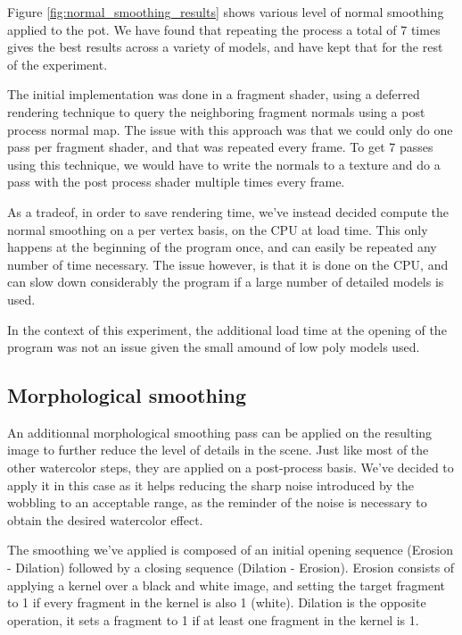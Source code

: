 \documentclass{article}
\begin{document}
\noindent
Figure \ref{fig:normal_smoothing_results} shows various level of normal smoothing applied to the pot. 
We have found that repeating the process a total of 7 times gives the best results across a variety of models,
and have kept that for the rest of the experiment.

\medskip \par
\noindent
The initial implementation was done in a fragment shader, using a deferred rendering technique to query the 
neighboring fragment normals using a post process normal map. The issue with this approach was that we could 
only do one pass per fragment shader, and that was repeated every frame. To get 7 passes using this technique, 
we would have to write the normals to a texture and do a pass with the post process shader multiple times every 
frame.

\medskip \par
\noindent
As a tradeof, in order to save rendering time, we've instead decided compute the normal smoothing on a per vertex basis, on
the CPU at load time. This only happens at the beginning of the program once, and can easily be repeated any 
number of time necessary. The issue however, is that it is done on the CPU, and can slow down considerably the 
program if a large number of detailed models is used. 

\medskip \par
\noindent
In the context of this experiment, the additional load time at the opening of the program was not an issue 
given the small amound of low poly models used.

\subsection{Morphological smoothing}

An additionnal morphological smoothing pass can be applied on the resulting image to further reduce the level
of details in the scene. Just like most of the other watercolor steps, they are applied on a post-process basis.
We've decided to apply it in this case as it helps reducing the sharp noise introduced by the wobbling to an
acceptable range, as the reminder of the noise is necessary to obtain the desired watercolor effect.

\medskip \par
\noindent
The smoothing we've applied is composed of an initial opening sequence (Erosion - Dilation) followed by a closing sequence
(Dilation - Erosion). Erosion consists of applying a kernel over a black and white image, and setting the target
fragment to 1 if every fragment in the kernel is also 1 (white). Dilation is the opposite operation, it sets a fragment
to 1 if at least one fragment in the kernel is 1. 
\end{document}
